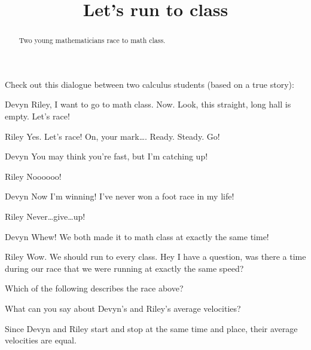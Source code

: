 \documentclass{ximera}
\title[Break-Ground:]{Let's run to class}
\begin{document}
\begin{abstract}
Two young mathematicians race to math class.
\end{abstract}
\maketitle

Check out this dialogue between two calculus students (based on a true
story):


\begin{dialogue}
\item[Devyn] Riley, I want to go to math class. Now. Look, this straight, long hall is empty. Let's race!
\item[Riley] Yes. Let's race! On, your
  mark\dots. Ready. Steady. Go!
\item[Devyn] You may think you're fast, but I'm catching up!
\item[Riley] Noooooo!
\item[Devyn] Now I'm winning! I've never won a foot race in my life!
\item[Riley] Never\dots give\dots up!
\item[Devyn] Whew! We both made it to math class at exactly the same
  time!
\item[Riley] Wow. We should run to every class. Hey I have a question,
  was there a time during our race that we were running at exactly the
  same speed?
\end{dialogue}

\begin{problem}
  Which of the following describes the race above?
  \begin{multipleChoice}
  \end{multipleChoice}
\end{problem}

\begin{problem}
  What can you say about Devyn's and Riley's average velocities?
  \begin{multipleChoice}
  \begin{feedback}
    Since Devyn and Riley start and stop at the same time and place,
    their average velocities are equal.
  \end{feedback}
  \end{multipleChoice}
\end{problem}
\end{document}
